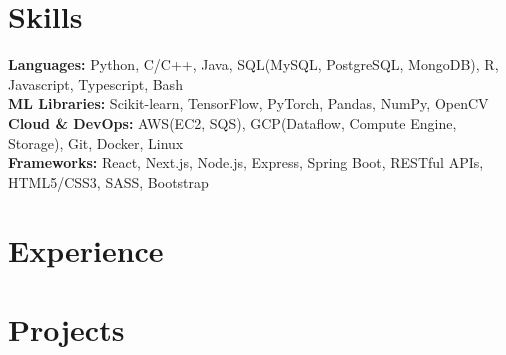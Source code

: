 \documentclass[letterpaper,11pt]{article}
\newcommand{\resumeSubHeadingListStart}{\begin{itemize}[leftmargin=0.15in, label={}]}
\newcommand{\resumeSubHeadingListEnd}{\end{itemize}}
\begin{document}




 \section{Skills}
\begin{itemize}[leftmargin=0.15in, label={}]
  \small{\item{
    \textbf{Languages:} Python, C/C++, Java, SQL(MySQL, PostgreSQL, MongoDB), R, Javascript, Typescript, Bash \\
    \textbf{ML Libraries:} Scikit-learn, TensorFlow, PyTorch, Pandas, NumPy, OpenCV \\
    \textbf{Cloud \& DevOps:} AWS(EC2, SQS), GCP(Dataflow, Compute Engine, Storage), Git, Docker, Linux \\
    \textbf{Frameworks:} React, Next.js, Node.js, Express, Spring Boot, RESTful APIs, HTML5/CSS3, SASS, Bootstrap \\
  }}
\end{itemize}

\section{Experience}
\resumeSubHeadingListStart
  
  
\resumeSubHeadingListEnd

\section{Projects}
  \resumeSubHeadingListStart

  
  
  
  
  
  

  
  \resumeSubHeadingListEnd
  
\end{document}

